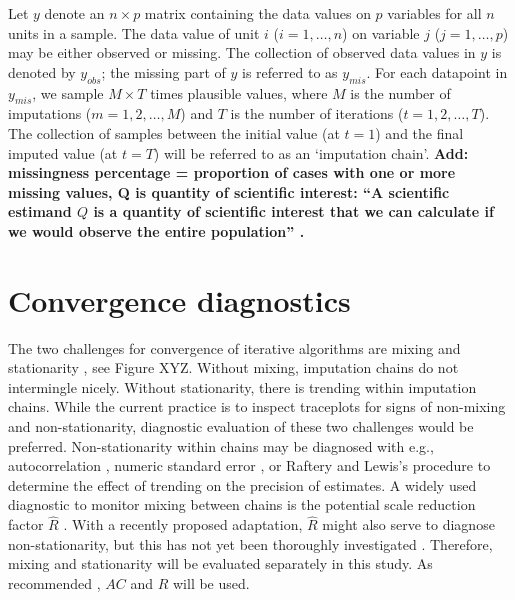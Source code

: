 \documentclass[Royal,times,sageh]{sagej}
\begin{document}
Let \(y\) denote an \(n \times p\) matrix containing the data values on
\(p\) variables for all \(n\) units in a sample. The data value of unit
\(i\) (\(i = 1, \dots, n\)) on variable \(j\) (\(j = 1, \dots, p\)) may
be either observed or missing. The collection of observed data values in
\(y\) is denoted by \(y_{obs}\); the missing part of \(y\) is referred
to as \(y_{mis}\). For each datapoint in \(y_{mis}\), we sample
\(M \times T\) times plausible values, where \(M\) is the number of
imputations (\(m = 1, 2, \dots, M\)) and \(T\) is the number of
iterations (\(t = 1, 2, \dots, T\)). The collection of samples between
the initial value (at \(t=1\)) and the final imputed value (at \(t=T\))
will be referred to as an `imputation chain'. \textbf{Add: missingness
percentage = proportion of cases with one or more missing values, Q is
quantity of scientific interest: ``A scientific estimand \(Q\) is a
quantity of scientific interest that we can calculate if we would
observe the entire population'' \citep[par 2.3.1]{buur18}. }

\hypertarget{convergence-diagnostics}{%
\section{Convergence diagnostics}\label{convergence-diagnostics}}

The two challenges for convergence of iterative algorithms are mixing
and stationarity \citep{gelm13}, see Figure XYZ. Without mixing,
imputation chains do not intermingle nicely. Without stationarity, there
is trending within imputation chains. While the current practice is to
inspect traceplots for signs of non-mixing and non-stationarity,
diagnostic evaluation of these two challenges would be preferred.
Non-stationarity within chains may be diagnosed with e.g.,
autocorrelation \citep[\(AC\);][]{scha97, gelm13}, numeric standard
error \citep[`MC error';][]{gewe92}, or Raftery and Lewis's
\citeyearpar{raft91} procedure to determine the effect of trending on
the precision of estimates. A widely used diagnostic to monitor mixing
between chains is the potential scale reduction factor \(\widehat{R}\)
\citep[`Gelman-Rubin statistic';][]{gelm92}. With a recently proposed
adaptation, \(\widehat{R}\) might also serve to diagnose
non-stationarity, but this has not yet been thoroughly investigated
\citep{veht19}. Therefore, mixing and stationarity will be evaluated
separately in this study. As recommended \citep[e.g.,][p.~898]{cowl96},
\(AC\) and \(\widehat{R}\) will be used.
\end{document}
